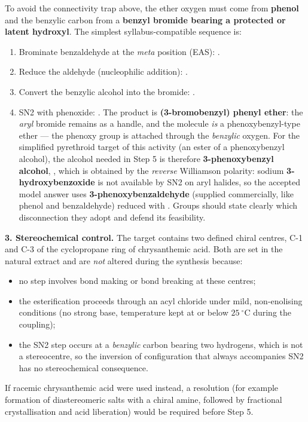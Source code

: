 \documentclass[11pt]{article}
\newcommand{\cle}[1]{{\popxbold\color{popdark}#1}}
\begin{document}
\begin{methode}
To avoid the connectivity trap above, the ether oxygen must come from \textbf{phenol} and the benzylic carbon from a \textbf{benzyl bromide bearing a protected or latent hydroxyl}. The simplest syllabus-compatible sequence is:
\begin{enumerate}
    \item Brominate benzaldehyde at the \emph{meta} position (\cle{EAS}): .
    \item Reduce the aldehyde (\cle{nucleophilic addition}): .
    \item Convert the benzylic alcohol into the bromide: .
    \item \cle{SN2} with phenoxide: . The product is \textbf{(3-bromobenzyl) phenyl ether}: the \emph{aryl} bromide remains as a handle, and the molecule \emph{is} a phenoxybenzyl-type ether --- the phenoxy group is attached through the \emph{benzylic} oxygen. For the simplified pyrethroid target of this activity (an ester of a phenoxybenzyl alcohol), the alcohol needed in Step 5 is therefore \textbf{3-phenoxybenzyl alcohol}, , which is obtained by the \emph{reverse} Williamson polarity: sodium \textbf{3-hydroxybenzoxide} is not available by \cle{SN2} on aryl halides, so the accepted model answer uses \textbf{3-phenoxybenzaldehyde} (supplied commercially, like phenol and benzaldehyde) reduced with . Groups should state clearly which disconnection they adopt and defend its feasibility.
\end{enumerate}
\end{methode}

\textbf{3. Stereochemical control.}
The target contains two defined chiral centres, C-1 and C-3 of the cyclopropane ring of chrysanthemic acid. Both are set in the natural extract and are \emph{not} altered during the synthesis because:
\begin{itemize}
    \item no step involves bond making or bond breaking at these centres;
    \item the esterification proceeds through an acyl chloride under mild, non-enolising conditions (no strong base, temperature kept at or below $25\ ^{\circ}\mathrm{C}$ during the coupling);
    \item the \cle{SN2} step occurs at a \emph{benzylic} carbon bearing two hydrogens, which is not a stereocentre, so the inversion of configuration that always accompanies \cle{SN2} has no stereochemical consequence.
\end{itemize}
If racemic chrysanthemic acid were used instead, a \cle{resolution} (for example formation of diastereomeric salts with a chiral amine, followed by fractional crystallisation and acid liberation) would be required before Step 5.
\end{document}
